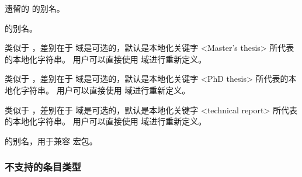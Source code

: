 \begin{typelist}

\BibTeX 遗留的  的别名。

的别名。

类似于 ，差别在于  域是可选的，默认是本地化关键字 <Master's thesis> 所代表的本地化字符串。
用户可以直接使用  域进行重新定义。

类似于  ，差别在于  域是可选的，默认是本地化关键字 <PhD thesis> 所代表的本地化字符串。
用户可以直接使用  域进行重新定义。

类似于 ，差别在于  域是可选的，默认是本地化关键字 <technical report> 所代表的本地化字符串。
用户可以直接使用  域进行重新定义。

 的别名，用于兼容  宏包。

\end{typelist}

\subsubsection{不支持的条目类型}
\label{bib:typ:ctm}


